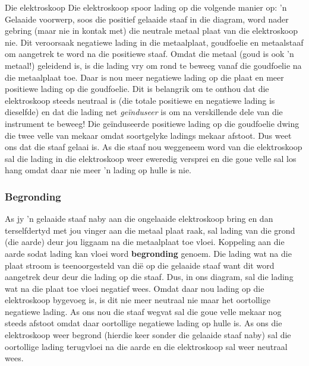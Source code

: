 \begin{i_experiment}{Die elektroskoop}
Die elektroskoop spoor lading op die volgende manier op: 'n Gelaaide voorwerp, soos die positief gelaaide staaf in die diagram, word nader gebring (maar nie in kontak met) die neutrale metaal plaat van die elektroskoop nie. Dit veroorsaak negatiewe lading in die metaalplaat, goudfoelie en metaalstaaf om aangetrek te word na die positiewe staaf. Omdat die metaal (goud is ook 'n metaal!) geleidend is, is die lading vry om rond te beweeg vanaf die goudfoelie na die metaalplaat toe. Daar is nou meer negatiewe lading op die plaat en meer positiewe lading op die goudfoelie. Dit is belangrik om te onthou dat die elektroskoop steeds neutraal is (die totale positiewe en negatiewe lading is dieselfde) en dat die lading net \textsl{ge\"induseer} is om na verskillende dele van die instrument te beweeg! Die ge\"induseerde positiewe lading op die goudfoelie dwing die twee velle van mekaar omdat soortgelyke ladings mekaar afstoot. Dus weet ons dat die staaf gelaai is. As die staaf nou weggeneem word van die elektroskoop sal die lading in die elektroskoop weer eweredig versprei en die goue velle sal los hang omdat daar nie meer 'n lading op hulle is nie. \par




\subsubsection{Begronding}
\nopagebreak

As jy 'n gelaaide staaf naby aan die ongelaaide elektroskoop bring en dan terselfdertyd met jou vinger aan die metaal plaat raak, sal lading van die grond (die aarde) deur jou liggaam na die metaalplaat toe vloei. Koppeling aan die aarde sodat lading kan vloei word \textbf{begronding} genoem. Die lading wat na die plaat stroom is teenoorgesteld van di\"e op die gelaaide staaf want dit word aangetrek deur deur die lading op die staaf. Dus, in ons diagram, sal die lading wat na die plaat toe vloei negatief wees. Omdat daar nou lading op die elektroskoop bygevoeg is, is dit nie meer neutraal nie maar het oortollige negatiewe lading. As ons nou die staaf wegvat sal die goue velle mekaar nog steeds afstoot omdat daar oortollige negatiewe lading op hulle is. As ons die elektroskoop weer begrond (hierdie keer sonder die gelaaide staaf naby) sal die oortollige lading terugvloei na die aarde en die elektroskoop sal weer neutraal wees. \par


\end{i_experiment}
